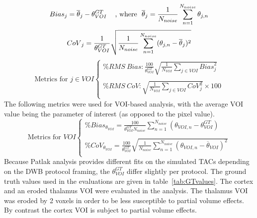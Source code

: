 \begin{equation}
\label{eq:BiasImage}
{Bias}_{j}  = \overline{\theta}_{j} - \theta_{VOI}^{GT} \  \hspace{3mm} 
\text{, where } \ 
\overline{\theta}_{j}  = \frac{1}{N_{noise}} \sum_{n=1}^{N_{noise}} {\theta_{j,n}} \\ 
\end{equation}
%
%
\begin{equation}
\label{eq:CoVImage}
{CoV}_{j}  = \frac{1}{{\theta_{VOI}^{GT}}} \sqrt{\frac{1}{N_{noise}}\sum_{n=1}^{N_{noise}} (\theta_{j,n} - \overline{\theta}_{j} )^2}  \\
\end{equation}
%
\!
%
%
\begin{equation}
\label{eq:VoxMetrics}
\text{Metrics for } {j\in VOI}
\begin{cases}  
\% RMS\ {Bias} : \frac{100}{{\theta_{VOI}^{GT}}} \sqrt{\frac{1}{N_{VOI}} \sum_{j\in VOI} {Bias}_{j}^{2}} \\ \\  
\% RMS\ {CoV}  : \sqrt{\frac{1}{N_{VOI}} \sum_{j\in VOI} {CoV}_{j}^{2}}  \times100\\
\end{cases}
\end{equation}
The following metrics were used for VOI-based analysis, with the average VOI value being the parameter of interest (as opposed to the pixel value).
\begin{equation}
\text{Metrics for } {VOI}
\begin{cases}
\% {Bias}_{{\theta}_{VOI}} = \frac{100}{\theta_{VOI}^{GT} N_{noise} } \sum_{n=1}^{N_{noise}} ({\theta_{VOI,n} - \theta_{VOI}^{GT}}) \\ \\
\% CoV_{{\theta}_{VOI}} = \frac{100}{{\theta_{VOI}^{GT}}} \sqrt{ \frac{1}{N_{noise}} \sum_{n=1}^{N_{noise}} (\theta_{VOI,n} - \overline{\theta}_{VOI} )^2 }   \\ 
\end{cases}
\end{equation}
%
Because Patlak analysis provides different fits on the simulated TACs depending on the DWB protocol framing, the $\theta_{VOI}^{GT}$ differ slightly per protocol. The ground truth values used in the evaluations are given in table~\ref{tab:GTvalues}. 
The cortex and an eroded thalamus VOI were evaluated in the analysis.
The thalamus VOI was eroded by 2 voxels 
in order to be less susceptible to partial volume effects. By contrast the cortex VOI is subject to partial volume effects.

